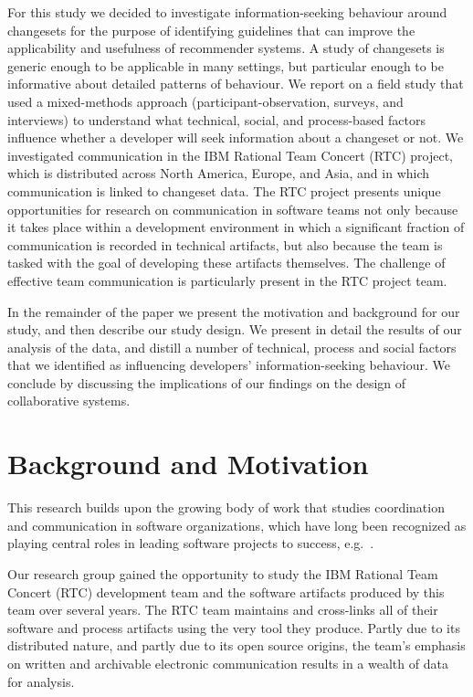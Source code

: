 \documentclass[12pt,oneside]{book}
\begin{document}
For this study we decided to investigate information-seeking behaviour around changesets for the purpose of identifying guidelines that can improve the applicability and usefulness of recommender systems. A study of changesets is generic enough to be applicable in many settings, but particular enough to be informative about detailed patterns of behaviour. We report on a field study that used a mixed-methods approach (participant-observation, surveys, and interviews) to understand what technical, social, and process-based factors influence whether a developer will seek information about a changeset or not. We investigated communication in the IBM Rational Team Concert (RTC) project, which is distributed across North America, Europe, and Asia, and in which communication is linked to changeset data. The RTC project presents unique opportunities for research on communication in software teams not only because it takes place within a development environment in which a significant fraction of communication is recorded in technical artifacts, but also because the team is tasked with the goal of developing these artifacts themselves. The challenge of effective team communication is particularly present in the RTC project team. 

In the remainder of the paper we present the motivation and background for our study, and then describe our study design.  We present in detail the results of our analysis of the data, and distill a number of technical, process and social factors that we identified as influencing developers' information-seeking behaviour. We conclude by discussing the implications of our findings on the design of collaborative systems. 

\section{Background and Motivation}
\label{sec:rq}

This research builds upon the growing body of work that studies coordination and communication in software organizations, which have long been recognized as playing central roles in leading software projects to success, e.g.~\cite{kraut:1995coordination,curtis:acm:1988}.  
\vspace{-2pt}

Our research group gained the opportunity to study the IBM Rational Team Concert (RTC) development team and the software artifacts produced by this team over several years. The RTC team maintains and cross-links all of their software and process artifacts using the very tool they produce. Partly due to its distributed nature, and partly due to its open source origins, the team's emphasis on written and archivable electronic communication results in a wealth of data for analysis.
\vspace{-2pt}
\end{document}
